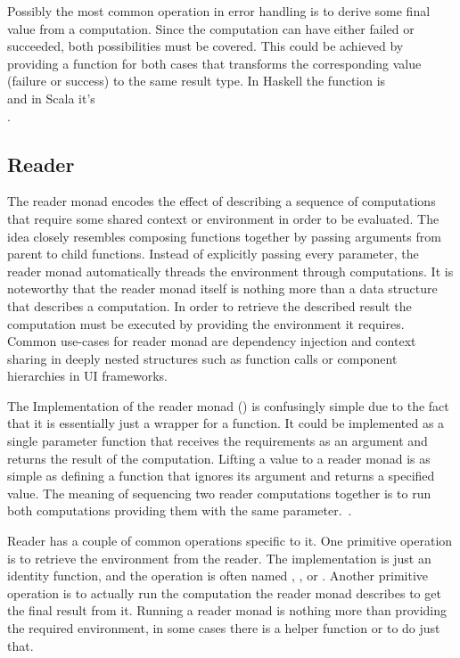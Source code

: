 Possibly the most common operation in error handling is to derive some final value from a computation. Since the computation can have either failed or succeeded, both possibilities must be covered. This could be achieved by providing a function for both cases that transforms the corresponding value (failure or success) to the same result type. In Haskell the function is \\ and in Scala it's \\. 


\subsection{Reader}
The reader monad encodes the effect of describing a sequence of computations that require some shared context or environment in order to be evaluated. The idea closely resembles composing functions together by passing arguments from parent to child functions. Instead of explicitly passing every parameter, the reader monad automatically threads the environment through computations. It is noteworthy that the reader monad itself is nothing more than a data structure that describes a computation. In order to retrieve the described result the computation must be executed by providing the environment it requires. Common use-cases for reader monad are dependency injection and context sharing in deeply nested structures such as function calls or component hierarchies in UI frameworks.



The Implementation of the reader monad () is confusingly simple due to the fact that it is essentially just a wrapper for a function. It could be implemented as a single parameter function that receives the requirements as an argument and returns the result of the computation. Lifting a value to a reader monad is as simple as defining a function that ignores its argument and returns a specified value. The meaning of sequencing two reader computations together is to run both computations providing them with the same parameter.~\cite{fp-overloading-ho-polymorphism}.

Reader has a couple of common operations specific to it. One primitive operation is to retrieve the environment from the reader. The implementation is just an identity function, and the operation is often named , , or . Another primitive operation is to actually run the computation the reader monad describes to get the final result from it. Running a reader monad is nothing more than providing the required environment, in some cases there is a helper function  or  to do just that.


